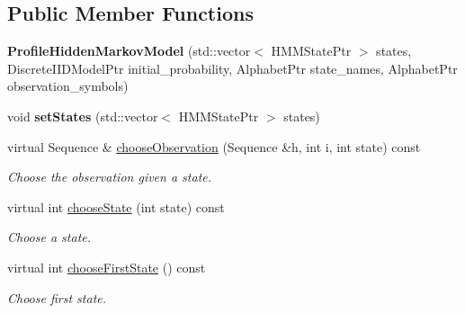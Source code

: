 \subsection*{Public Member Functions}
\begin{DoxyCompactItemize}
\item 
\mbox{\label{classtops_1_1ProfileHiddenMarkovModel_a59c16803b5c9d4728ce6718a53bfc9d7}} 
{\bfseries Profile\+Hidden\+Markov\+Model} (std\+::vector$<$ H\+M\+M\+State\+Ptr $>$ states, Discrete\+I\+I\+D\+Model\+Ptr initial\+\_\+probability, Alphabet\+Ptr state\+\_\+names, Alphabet\+Ptr observation\+\_\+symbols)
\item 
\mbox{\label{classtops_1_1ProfileHiddenMarkovModel_aa97a447a26fc4b58d6d80ac2f42a2591}} 
void {\bfseries set\+States} (std\+::vector$<$ H\+M\+M\+State\+Ptr $>$ states)
\item 
\mbox{\label{classtops_1_1ProfileHiddenMarkovModel_a369bbe95930890c2460ee1b56b4415f5}} 
virtual Sequence \& \hyperlink{classtops_1_1ProfileHiddenMarkovModel_a369bbe95930890c2460ee1b56b4415f5}{choose\+Observation} (Sequence \&h, int i, int state) const
\begin{DoxyCompactList}\small\item\em Choose the observation given a state. \end{DoxyCompactList}\item 
\mbox{\label{classtops_1_1ProfileHiddenMarkovModel_a1db02c5be26d5288ec4d1b29ebc5d729}} 
virtual int \hyperlink{classtops_1_1ProfileHiddenMarkovModel_a1db02c5be26d5288ec4d1b29ebc5d729}{choose\+State} (int state) const
\begin{DoxyCompactList}\small\item\em Choose a state. \end{DoxyCompactList}\item 
\mbox{\label{classtops_1_1ProfileHiddenMarkovModel_a036255a9ac77cafd2cad175d01f4870f}} 
virtual int \hyperlink{classtops_1_1ProfileHiddenMarkovModel_a036255a9ac77cafd2cad175d01f4870f}{choose\+First\+State} () const
\begin{DoxyCompactList}\small\item\em Choose first state. \end{DoxyCompactList}\item 

\end{DoxyCompactItemize}
